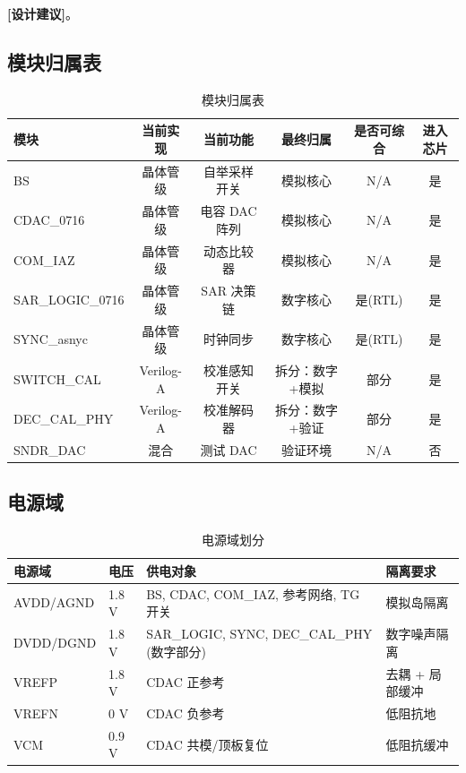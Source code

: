\documentclass[UTF8,a4paper,11pt]{ctexart}
\newcommand{\suggested}{\textcolor{suggestblue}{\textbf{[设计建议]}}}
\begin{document}
 \suggested。

\subsection{模块归属表}

\begin{table}[H]
\centering
\caption{模块归属表}
\label{tab:module-ownership}
\small
\begin{tabular}{lccccc}
\toprule
模块 & 当前实现 & 当前功能 & 最终归属 & 是否可综合 & 进入芯片 \\
\midrule
BS             & 晶体管级 & 自举采样开关 & 模拟核心       & N/A    & 是 \\
CDAC\_0716     & 晶体管级 & 电容 DAC 阵列 & 模拟核心       & N/A    & 是 \\
COM\_IAZ       & 晶体管级 & 动态比较器   & 模拟核心       & N/A    & 是 \\
SAR\_LOGIC\_0716 & 晶体管级 & SAR 决策链  & 数字核心       & 是(RTL) & 是 \\
SYNC\_asnyc    & 晶体管级 & 时钟同步     & 数字核心       & 是(RTL) & 是 \\
SWITCH\_CAL    & Verilog-A & 校准感知开关 & 拆分：数字+模拟 & 部分   & 是 \\
DEC\_CAL\_PHY  & Verilog-A & 校准解码器   & 拆分：数字+验证 & 部分   & 是 \\
SNDR\_DAC      & 混合     & 测试 DAC     & 验证环境       & N/A    & 否 \\
\bottomrule
\end{tabular}
\end{table}

\subsection{电源域}

\begin{table}[H]
\centering
\caption{电源域划分}
\label{tab:power-domain}
\begin{tabular}{lllp{5cm}}
\toprule
电源域 & 电压 & 供电对象 & 隔离要求 \\
\midrule
AVDD/AGND & 1.8 V & BS, CDAC, COM\_IAZ, 参考网络, TG 开关 & 模拟岛隔离 \\
DVDD/DGND & 1.8 V & SAR\_LOGIC, SYNC, DEC\_CAL\_PHY (数字部分) & 数字噪声隔离 \\
VREFP     & 1.8 V & CDAC 正参考 & 去耦 + 局部缓冲 \\
VREFN     & 0 V   & CDAC 负参考 & 低阻抗地 \\
VCM       & 0.9 V & CDAC 共模/顶板复位 & 低阻抗缓冲 \\
\bottomrule
\end{tabular}
\end{table}
\end{document}
